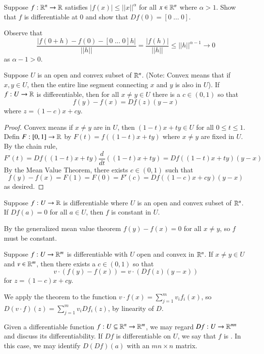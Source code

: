 \begin{example}
    Suppose $f:\mathbb R^n\rightarrow \mathbb R$ satisfies $|f(x)| \leq ||x||^{\alpha}$ for all $x \in \mathbb R^n$ where $\alpha > 1$. Show that $f$ is differentiable at $0$ and show that $Df(0) = [0\;...\;0]$.
    
    Observe that $$\frac{|f(0+h)-f(0)-[0\;...\;0]h|}{||h||} = \frac{|f(h)|}{||h||} \leq ||h||^{\alpha -1}\rightarrow 0$$ as $\alpha - 1 > 0$.
\end{example}

\begin{theorem}
    Suppose $U$ is an open and convex subset of $\mathbb R^n$. (Note: Convex means that if $x,y \in U$, then the entire line segment connecting $x$ and $y$ is also in $U$). If $f:U\rightarrow \mathbb R$ is differentiable, then for all $x \neq y \in U$ there is a $c \in (0,1)$ so that $$f(y) - f(x) = Df(z)(y-x)$$ where $z = (1-c)x+cy$.
\end{theorem}
\begin{proof}
    Convex means if $x \neq y$ are in $U$, then $(1-t)x+ty \in U$ for all $0 \leq t \leq 1$. Defin $F:[0,1]\rightarrow \mathbb R$ by $F(t) = f((1-t)x+ty)$ where $x \neq y$ are fixed in $U$. By the chain rule, $$F'(t) = Df((1-t)x+ty)\frac{d}{dt}((1-t)x+ty) = Df((1-t)x+ty)(y-x)$$ By the Mean Value Theorem, there exists $c \in (0,1)$ such that $$f(y) - f(x) = F(1) = F(0) = F'(c) = Df((1-c)x+cy)(y-x)$$ as desired.
\end{proof}

\begin{corollary}
    Suppose $f:U\rightarrow \mathbb R$ is differentiable where $U$ is an open and convex subset of $\mathbb R^n$. If $Df(a) = 0$ for all $a \in U$, then $f$ is constant in $U$.
\end{corollary}
By the generalized mean value theorem $f(y)-f(x) = 0$ for all $x \neq y$, so $f$ must be constant.

\begin{corollary}
    Suppose $f:U\rightarrow \mathbb R^m$ is differentiable with $U$ open and convex in $\mathbb R^n$. If $x \neq y \in U$ and $v \in \mathbb R^m$, then there exists a $c \in (0,1)$ so that $$v\cdot(f(y) - f(x)) = v\cdot(Df(z)(y-x))$$ for $z  = (1-c)x+cy$.
\end{corollary}
We apply the theorem to the function $v\cdot f(x) = \sum_{j=1}^mv_if_i(x)$, so $D(v\cdot f)(z) = \sum_{j=1}^mv_iDf_i(z)$, by linearity of $D$.

\begin{definition}
    Given a differentiable function $f:U\subseteq \mathbb R^n\rightarrow \mathbb R^m$, we may regard $Df:U\rightarrow \mathbb R^{mn}$ and discuss its differentiability. If $Df$ is differentiable on $U$, we say that $f$ is . In this case, we may identify $D(Df)(a)$ with an $mn\times n$ matrix.
\end{definition}


